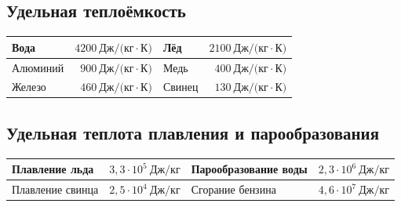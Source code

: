 \subsection*{Удельная теплоёмкость}
\noindent\begin{tabularx}{\linewidth}{X r || X r}
\hline
Вода & $4200~\text{Дж/(кг}\cdot\text{К)}$ & Лёд & $2100~\text{Дж/(кг}\cdot\text{К)}$ \\ \hline
Алюминий & $900~\text{Дж/(кг}\cdot\text{К)}$ & Медь & $400~\text{Дж/(кг}\cdot\text{К)}$ \\ \hline
Железо & $460~\text{Дж/(кг}\cdot\text{К)}$ & Свинец & $130~\text{Дж/(кг}\cdot\text{К)}$ \\ \hline
\end{tabularx}

\subsection*{Удельная теплота плавления и парообразования}
\noindent\begin{tabularx}{\linewidth}{X r || X r}
\hline
Плавление льда & $3{,}3 \cdot 10^5~\text{Дж/кг}$ & Парообразование воды & $2{,}3 \cdot 10^6~\text{Дж/кг}$ \\ \hline
Плавление свинца & $2{,}5 \cdot 10^4~\text{Дж/кг}$ & Сгорание бензина & $4{,}6 \cdot 10^7~\text{Дж/кг}$ \\ \hline
\end{tabularx}
\vspace{6pt}
\endgroup
\newpage

